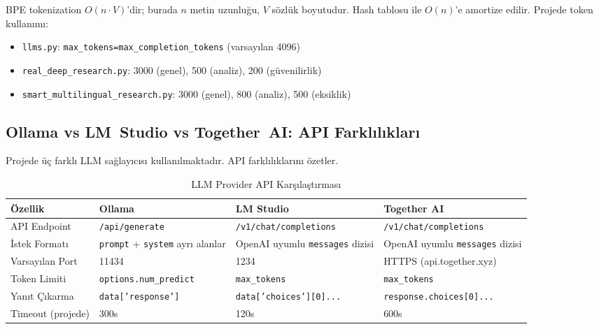 \begin{formulbox}
BPE tokenization $O(n \cdot V)$'dir; burada $n$ metin uzunlu\u{g}u, $V$ s\"{o}zl\"{u}k boyutudur. Hash tablosu ile $O(n)$'e amortize edilir. Projede token kullan{\i}m{\i}:
\begin{itemize}[leftmargin=1.5em]
  \item \texttt{llms.py}: \texttt{max\_tokens=max\_completion\_tokens} (varsay{\i}lan 4096)
  \item \texttt{real\_deep\_research.py}: 3000 (genel), 500 (analiz), 200 (g\"{u}venilirlik)
  \item \texttt{smart\_multilingual\_research.py}: 3000 (genel), 800 (analiz), 500 (eksiklik)
\end{itemize}
\end{formulbox}


\subsection{Ollama vs LM~Studio vs Together~AI: API Farkl{\i}l{\i}klar{\i}}
\label{sec:provider-diff}

Projede \"{u}\c{c} farkl{\i} LLM sa\u{g}lay{\i}c{\i}s{\i} kullan{\i}lmaktad{\i}r.  API farkl{\i}l{\i}klar{\i}n{\i} \"{o}zetler.

\begin{table}[H]
\centering
\caption{LLM Provider API Kar\c{s}{\i}la\c{s}t{\i}rmas{\i}}
\label{tab:provider-cmp}
\begin{tabularx}{\textwidth}{lXXX}
\toprule
\color{chapterBlue}\textbf{\"{O}zellik} &
\color{chapterBlue}\textbf{Ollama} &
\color{chapterBlue}\textbf{LM Studio} &
\color{chapterBlue}\textbf{Together AI} \\
\midrule
API Endpoint & \texttt{/api/generate} & \texttt{/v1/chat/completions} & \texttt{/v1/chat/completions} \\
\.{I}stek Format{\i} & \texttt{prompt} + \texttt{system} ayr{\i} alanlar & OpenAI uyumlu \texttt{messages} dizisi & OpenAI uyumlu \texttt{messages} dizisi \\
Varsay{\i}lan Port & 11434 & 1234 & HTTPS (api.together.xyz) \\
Token Limiti & \texttt{options.num\_predict} & \texttt{max\_tokens} & \texttt{max\_tokens} \\
Yan{\i}t \c{C}{\i}karma & \texttt{data['response']} & \texttt{data['choices'][0]...} & \texttt{response.choices[0]...} \\
Timeout (projede) & 300s & 120s & 600s \\
\bottomrule
\end{tabularx}
\end{table}

